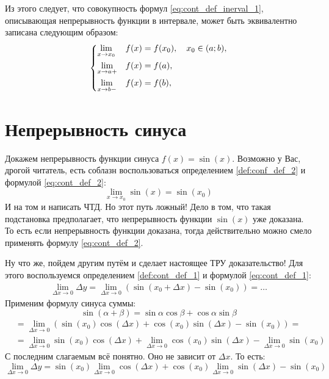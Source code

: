 \documentclass[a4paper, 12pt, final]{article}
\begin{document}
Из этого следует, что совокупность формул \eqref{eq:cont_def_inerval_1}, описывающая непрерывность функции в интервале, может быть эквивалентно записана следующим образом:
\begin{equation}
    \begin{dcases}
        \lim_{x \to x_0} &f(x) = f(x_0), \quad x_0 \in (a;b),\\
        \lim_{x \to a+ } &f(x) = f(a),                     \\
        \lim_{x \to b- } &f(x) = f(b),
    \end{dcases}
    \label{eq:cont_def_inerval_2}
\end{equation}

\section{Непрерывность синуса}

Докажем непрерывность функции синуса $f(x)=\sin(x)$.
Возможно у Вас, дрогой читатель, есть соблазн воспользоваться определением \ref{def:conf_def_2} и формулой \eqref{eq:cont_def_2}:
\begin{equation*}
    \lim_{x \to x_0} \sin(x) = \sin(x_0)
\end{equation*}
И на том и написать ЧТД.
Но этот путь ложный!
Дело в том, что такая подстановка предполагает, что непрерывность функции $\sin(x)$ уже доказана.
То есть если непрерывность функции доказана, тогда действительно можно смело применять формулу \eqref{eq:cont_def_2}.

Ну что же, пойдем другим путём и сделает настоящее ТРУ доказательство!
Для этого воспользуемся определением \ref{def:cont_def_1} и формулой \eqref{eq:cont_def_1}:
\begin{align*}
    \lim_{\Delta x \to 0} \Delta y =
    \lim_{\Delta x \to 0} \left( \sin(x_0 + \Delta x) - \sin(x_0) \right) = \dots
\end{align*}
Применим формулу синуса суммы:
\begin{equation*}
    \sin (\alpha + \beta) = \sin \alpha \cos \beta + \cos \alpha \sin \beta
\end{equation*}
\begin{align*}
    &= \lim_{\Delta x \to 0} \left( \sin(x_0) \cos(\Delta x) + \cos (x_0) \sin(\Delta x) - \sin(x_0) \right) = \\
    &= \lim_{\Delta x \to 0} \sin(x_0) \cos(\Delta x) +
       \lim_{\Delta x \to 0} \cos(x_0) \sin(\Delta x) -
       \lim_{\Delta x \to 0} \sin(x_0)
\end{align*}
С последним слагаемым всё понятно.
Оно не зависит от $\Delta x$.
То есть:
\begin{equation}
    \lim_{\Delta x \to 0} \Delta y =
    \sin(x_0) \lim_{\Delta x \to 0} \cos(\Delta x) +
    \cos(x_0) \lim_{\Delta x \to 0} \sin(\Delta x) -
    \sin(x_0)
\end{equation}
\end{document}
